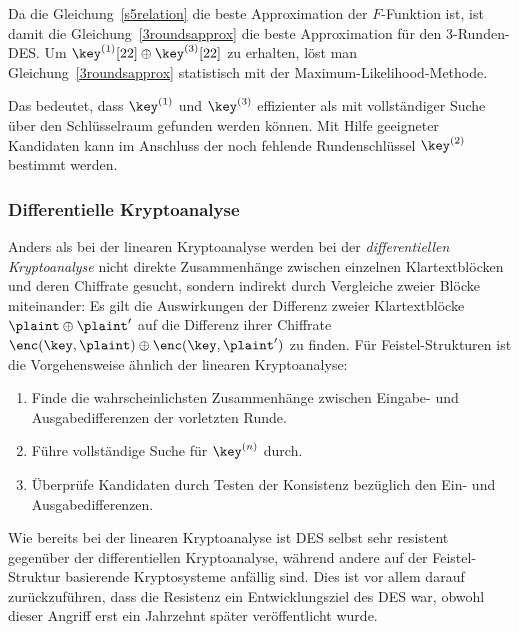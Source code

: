 Da die Gleichung~\ref{s5relation} die beste Approximation der $F$-Funktion ist, ist damit die Gleichung~\ref{3roundsapprox} die beste Approximation für den $3$-Runden-DES. Um $\key^{(1)}[22] \oplus \key^{(3)}[22]$ zu erhalten, löst man Gleichung~\ref{3roundsapprox} statistisch mit der Maximum-Likelihood-Methode.

Das bedeutet, dass $\key^{(1)}$ und $\key^{(3)}$ effizienter als mit vollständiger Suche über den Schlüsselraum gefunden werden können. Mit Hilfe geeigneter Kandidaten kann im Anschluss der noch fehlende Rundenschlüssel $\key^{(2)}$ bestimmt werden.

\subsubsection{Differentielle Kryptoanalyse}
\label{sssec:diffKryptoanalyse}
Anders als bei der linearen Kryptoanalyse werden bei der \emph{differentiellen Kryptoanalyse} nicht direkte Zusammenhänge zwischen einzelnen Klartextblöcken und deren Chiffrate gesucht, sondern indirekt durch Vergleiche zweier Blöcke miteinander: Es gilt die Auswirkungen der Differenz zweier Klartextblöcke $\plaint \oplus \plaint'$ auf die Differenz ihrer Chiffrate $\enc(\key, \plaint) \oplus \enc(\key, \plaint')$ zu finden.
Für Feistel-Strukturen ist die Vorgehensweise ähnlich der linearen Kryptoanalyse:
\begin{enumerate}
	\item Finde die wahrscheinlichsten Zusammenhänge zwischen Eingabe- und Ausgabedifferenzen der vorletzten Runde.
	\item Führe vollständige Suche für $\key^{(n)}$ durch.
	\item Überprüfe Kandidaten durch Testen der Konsistenz bezüglich den Ein- und Ausgabedifferenzen.
\end{enumerate}

Wie bereits bei der linearen Kryptoanalyse ist DES selbst sehr resistent gegenüber der differentiellen Kryptoanalyse, während andere auf der Feistel-Struktur basierende Kryptosysteme anfällig sind. Dies ist vor
allem darauf zurückzuführen, dass die Resistenz ein Entwicklungsziel des DES war, obwohl dieser Angriff erst ein Jahrzehnt später veröffentlicht wurde.

